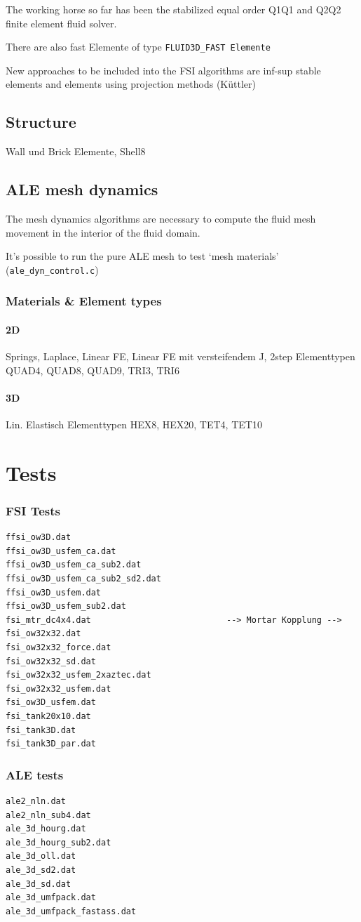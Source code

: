 The working horse so far has been the stabilized equal order Q1Q1 and Q2Q2 finite element fluid solver.

There are also fast Elemente of type \verb|FLUID3D_FAST Elemente|

New approaches to be included into the FSI algorithms are inf-sup stable elements and elements using projection methods (Küttler)

\subsection{Structure}


Wall und Brick Elemente, Shell8


\subsection{ALE mesh dynamics}

The mesh dynamics algorithms are necessary to compute the fluid mesh movement in the interior of the fluid domain.

It's possible to run the pure ALE mesh to test `mesh materials' (\verb|ale_dyn_control.c|)

\subsubsection{Materials \& Element types}
\paragraph{2D}

Springs, Laplace, Linear FE, Linear FE mit versteifendem J, 2step
Elementtypen
QUAD4, QUAD8, QUAD9, TRI3, TRI6

\paragraph{3D}

Lin. Elastisch
Elementtypen
HEX8, HEX20, TET4, TET10


\section{Tests}
\subsubsection{FSI Tests}
\begin{verbatim}
ffsi_ow3D.dat
ffsi_ow3D_usfem_ca.dat
ffsi_ow3D_usfem_ca_sub2.dat
ffsi_ow3D_usfem_ca_sub2_sd2.dat
ffsi_ow3D_usfem.dat
ffsi_ow3D_usfem_sub2.dat
fsi_mtr_dc4x4.dat                           --> Mortar Kopplung -->
fsi_ow32x32.dat
fsi_ow32x32_force.dat
fsi_ow32x32_sd.dat
fsi_ow32x32_usfem_2xaztec.dat
fsi_ow32x32_usfem.dat
fsi_ow3D_usfem.dat
fsi_tank20x10.dat
fsi_tank3D.dat
fsi_tank3D_par.dat
\end{verbatim}

\subsubsection{ALE tests}

\begin{verbatim}
ale2_nln.dat
ale2_nln_sub4.dat
ale_3d_hourg.dat
ale_3d_hourg_sub2.dat
ale_3d_oll.dat
ale_3d_sd2.dat
ale_3d_sd.dat
ale_3d_umfpack.dat
ale_3d_umfpack_fastass.dat
\end{verbatim}

